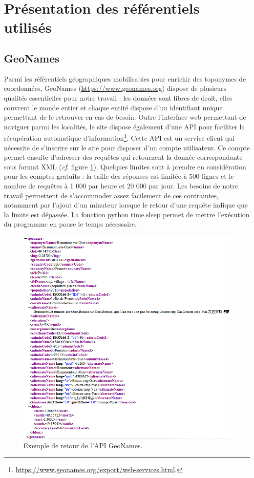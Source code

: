 \documentclass[a4paper,12pt,twoside]{book}
\begin{document}
	\section{Présentation des référentiels utilisés}
	
	\subsection{GeoNames}
	
	Parmi les référentiels géographiques mobilisables pour enrichir des toponymes de coordonnées, GeoNames (\url{https://www.geonames.org}) dispose de plusieurs qualités essentielles pour notre travail : les données sont libres de droit, elles couvrent le monde entier et chaque entité dispose d'un identifiant unique permettant de le retrouver en cas de besoin. Outre l'interface web permettant de naviguer parmi les localités, le site dispose également d'une API pour faciliter la récupération automatique d'information\footnote{\url{https://www.geonames.org/export/web-services.html}.}. Cette API est un service client qui nécessite de s'inscrire sur le site pour disposer d'un compte utilisateur. Ce compte permet ensuite d'adresser des requêtes qui retournent la donnée correspondante sous format XML (\textit{cf}. figure \ref{API_geonames}). Quelques limites sont à prendre en considération pour les comptes gratuits : la taille des réponses est limitée à 500 lignes et le nombre de requêtes à 1 000 par heure et 20 000 par jour. Les besoins de notre travail permettent de s'accommoder assez facilement de ces contraintes, notamment par l'ajout d'un minuteur lorsque le retour d'une requête indique que la limite est dépassée. La fonction python \og time.sleep\fg{} permet de mettre l'exécution du programme en pause le temps nécessaire.
	
	
	\begin{figure}
		\centering
		\includegraphics[width=\textwidth]{Images/Result_geonames.png}
		\caption{Exemple de retour de l'API GeoNames.}
		\label{API_geonames}
	\end{figure}
	
\end{document}
